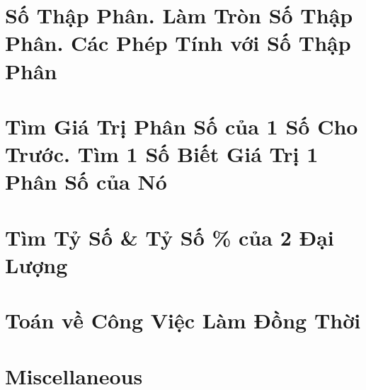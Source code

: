 \documentclass{article}
\numberwithin{equation}{section}
\begin{document}
\section{Số Thập Phân. Làm Tròn Số Thập Phân. Các Phép Tính với Số Thập Phân}


\section{Tìm Giá Trị Phân Số của 1 Số Cho Trước. Tìm 1 Số Biết Giá Trị 1 Phân Số của Nó}


\section{Tìm Tỷ Số \& Tỷ Số \% của 2 Đại Lượng}


\section{Toán về Công Việc Làm Đồng Thời}


\section{Miscellaneous}


\printbibliography[heading=bibintoc]
	
\end{document}
